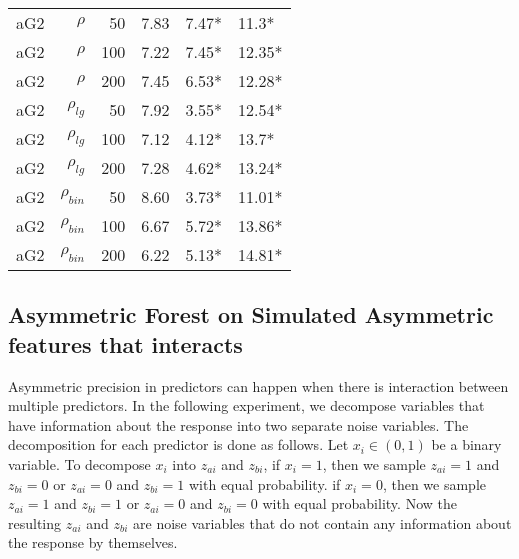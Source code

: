 \documentclass[twoside,11pt]{article}
\begin{document}
\begin{table}
\begin{tabular}{rrrp{2.5cm}p{2.5cm}p{2.5cm}}
\hline
aG2   & $\rho$ & 50    & 7.83  & 7.47* & 11.3* \bigstrut[t]\\
aG2   & $\rho$ & 100   & 7.22  & 7.45* & 12.35* \\
aG2   & $\rho$ & 200   & 7.45  & 6.53* & 12.28* \bigstrut[b]\\
\hline
aG2   & $\rho_{lg}$ & 50    & 7.92  & 3.55* & 12.54* \bigstrut[t]\\
aG2   & $\rho_{lg}$ & 100   & 7.12  & 4.12* & 13.7* \\
aG2   & $\rho_{lg}$ & 200   & 7.28  & 4.62* & 13.24* \bigstrut[b]\\
\hline
aG2   & $\rho_{bin}$ & 50    & 8.60  & 3.73* & 11.01* \bigstrut[t]\\
aG2   & $\rho_{bin}$ & 100   & 6.67  & 5.72* & 13.86* \\
aG2   & $\rho_{bin}$ & 200   & 6.22  & 5.13* & 14.81* \bigstrut[b]\\
\hline
\end{tabular}%
\label{tab:asymmetricfeaturesresults}%
\end{table}%


\subsection{Asymmetric Forest on Simulated Asymmetric features that interacts}
Asymmetric precision in predictors can happen when there is interaction between multiple predictors. In the following experiment, we decompose variables that have information about the response into two separate noise variables. The decomposition for each predictor is done as follows. Let $x_i \in (0,1)$ be a binary variable. To decompose $x_i$ into $z_{ai}$ and $z_{bi}$, if $x_i=1$, then we sample $z_{ai}=1$ and $z_{bi}=0$ or $z_{ai}=0$ and $z_{bi}=1$ with equal probability. if $x_i=0$, then we sample $z_{ai}=1$ and $z_{bi}=1$ or $z_{ai}=0$ and $z_{bi}=0$ with equal probability. Now the resulting $z_{ai}$ and $z_{bi}$ are noise variables that do not contain any information about the response by themselves.
\end{document}
